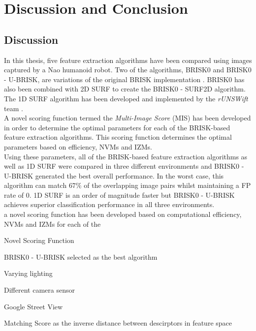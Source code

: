 \chapter{Discussion and Conclusion}
\label{sec:discussionConclusion}

\section{Discussion}
\label{sec:discussion}
In this thesis, five feature extraction algorithms have been compared using images captured by a Nao humanoid robot. Two of the algorithms, BRISK0 and BRISK0 - U-BRISK, are variations of the original BRISK implementation \cite{Leutenegger2011}. BRISK0 has also been combined with 2D SURF to create the BRISK0 - SURF2D algorithm. The 1D SURF algorithm has been developed and implemented by the \textit{rUNSWift} team \cite{Anderson}.\\

A novel scoring function termed the \textit{Multi-Image Score} (MIS) has been developed in order to determine the optimal parameters for each  of the BRISK-based feature extraction algorithms. This scoring function determines the optimal parameters based on efficiency, NVMs and IZMs.\\

Using these parameters, all of the BRISK-based feature extraction algorithms as well as 1D SURF were compared in three different environments and BRISK0 - U-BRISK generated the best overall performance. In the worst case, this algorithm can match $67\%$ of the overlapping image pairs whilst maintaining a FP rate of $0$. 1D SURF is an order of magnitude faster but BRISK0 - U-BRISK achieves superior classification performance in all three environments. \\





a novel scoring function has been developed based on computational efficiency, NVMs and IZMs for each of the 

Novel Scoring Function

BRISK0 - U-BRISK selected as the best algorithm

Varying lighting

Different camera sensor

Google Street View

Matching Score as the inverse distance between descirptors in feature space

